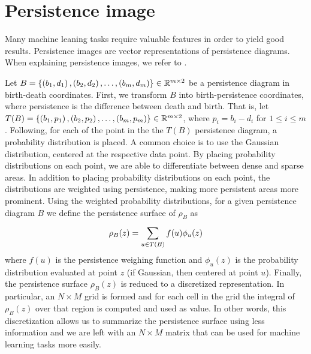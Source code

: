 \section{Persistence image}
Many machine leaning tasks require valuable features in order to yield good results. Persistence images \cite{adams2016persistence} are vector representations of persistence diagrams. When explaining persistence images, we refer to \cite{adams2016persistence}.

Let $B = \left\{\left(b_1, d_1\right), \left(b_2, d_2\right), \ldots, \left(b_m, d_m\right)\right\} \in \mathbb{R}^{m \times 2}$ be a persistence diagram in birth-death coordinates. First, we transform $B$ into birth-persistence coordinates, where persistence is the difference between death and birth. That is, let $T(B) = \left\{\left(b_1, p_1\right), \left(b_2, p_2\right), \ldots, \left(b_m, p_m\right)\right\} \in \mathbb{R}^{m \times 2}$, where $p_i = b_i - d_i$ for $1 \leq i \leq m$. Following, for each of the point in the the $T(B)$ persistence diagram, a probability distribution is placed. A common choice is to use the Gaussian distribution, centered at the respective data point. By placing probability distributions on each point, we are able to differentiate between dense and sparse areas. In addition to placing probability distributions on each point, the distributions are weighted using persistence, making more persistent areas more prominent. Using the weighted probability distributions, for a given persistence diagram $B$ we define the persistence surface of $\rho_B$ as
\begin{align}
    \rho_B(z) = \sum\limits_{u \in T(B)}^{} f(u) \phi_u(z)
\end{align}
where $f(u)$ is the persistence weighing function and $\phi_u(z)$ is the probability distribution evaluated at point $z$ (if Gaussian, then centered at point $u$). Finally, the persistence surface $\rho_B(z)$ is reduced to a discretized representation. In particular, an $N \times M$ grid is formed and for each cell in the grid the integral of $\rho_B(z)$ over that region is computed and used as value. In other words, this discretization allows us to summarize the persistence surface using less information and we are left with an $N \times M$ matrix that can be used for machine learning tasks more easily.

